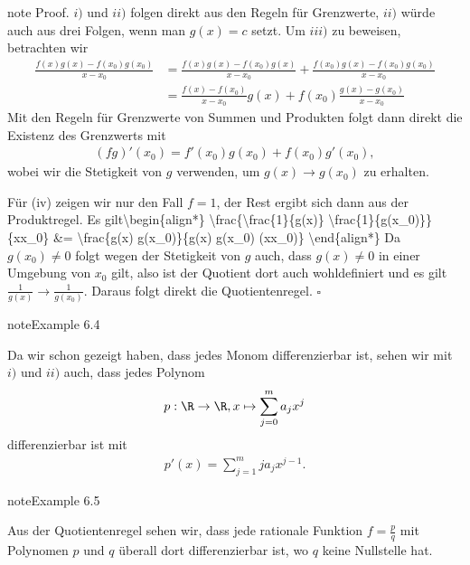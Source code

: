 \documentclass[letterpaper,10pt,english]{jupyterBook}
\begin{document}
\begin{sphinxadmonition}{note}
Proof. \(i)\) und \(ii)\) folgen direkt aus den Regeln für Grenzwerte, \(ii)\) würde auch aus drei Folgen, wenn man \(g(x) =c\) setzt. Um \(iii)\) zu beweisen, betrachten wir
\begin{align*} \frac{f(x)g(x) - f(x_0)g(x_0)}{x-x_0} &= \frac{f(x)g(x) - f(x_0)g(x)}{x-x_0} + \frac{f(x_0)g(x) - f(x_0)g(x_0)}{x-x_0} \\
 &= \frac{f(x)  - f(x_0) }{x-x_0} g(x) + f(x_0) \frac{g(x) - g(x_0)}{x-x_0}
\end{align*}
Mit den Regeln für Grenzwerte von Summen und Produkten folgt dann direkt die Existenz des Grenzwerts mit
\begin{equation*}
\begin{split} (fg)'(x_0) = f'(x_0) g(x_0) +  f(x_0) g'(x_0),\end{split}
\end{equation*}
wobei wir die Stetigkeit von \(g\) verwenden, um \(g(x) \rightarrow g(x_0)\) zu erhalten.

Für (iv) zeigen wir nur den Fall \(f=1\), der Rest ergibt sich dann aus der Produktregel. Es gilt\textbackslash{}begin\{align*\}
\textbackslash{}frac\{\textbackslash{}frac\{1\}\{g(x)\} \sphinxhyphen{} \textbackslash{}frac\{1\}\{g(x\_0)\}\}\{x\sphinxhyphen{}x\_0\} \&= \sphinxhyphen{} \textbackslash{}frac\{g(x) \sphinxhyphen{} g(x\_0)\}\{g(x) g(x\_0) (x\sphinxhyphen{}x\_0)\} \textbackslash{}end\{align*\}
Da \(g(x_0) \neq 0\) folgt wegen der Stetigkeit von \(g\) auch, dass \(g(x) \neq 0\) in einer Umgebung von \(x_0\) gilt, also ist der Quotient dort auch wohldefiniert und es gilt \(\frac{1}{g(x)} \rightarrow \frac{1}{g(x_0)}\). Daraus folgt direkt die Quotientenregel. \(\square\)
\end{sphinxadmonition}
\label{differential/kombfkt:example-1}
\begin{sphinxadmonition}{note}{Example 6.4}



Da wir schon gezeigt haben, dass jedes Monom differenzierbar ist, sehen wir mit \(i)\) und \(ii)\) auch, dass jedes Polynom
\begin{equation*}
\begin{split} p: \R \rightarrow \R, x \mapsto \sum_{j=0}^m a_j x^j\end{split}
\end{equation*}
differenzierbar ist mit
\begin{equation*}
\begin{split} p'(x) = \sum_{j=1}^m j a_j x^{j-1} .\end{split}
\end{equation*}\end{sphinxadmonition}
\label{differential/kombfkt:example-2}
\begin{sphinxadmonition}{note}{Example 6.5}



Aus der Quotientenregel sehen wir, dass jede rationale Funktion \(f= \frac{p}q\) mit Polynomen \(p\) und \(q\) überall dort differenzierbar ist, wo \(q\) keine Nullstelle hat.
\end{sphinxadmonition}
\end{document}
